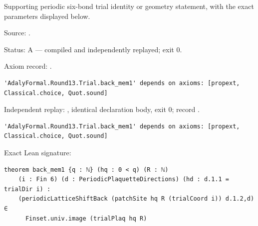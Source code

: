 \begin{theorem}[bp-390]
\label{bp-390}
\leanok
Supporting periodic six-bond trial identity or geometry statement, with the exact parameters displayed below.

\par Source: \texttt{}.
\par Status: A — compiled and independently replayed; exit 0.
\par Axiom record: \texttt{}.
\begin{verbatim}
'AdalyFormal.Round13.Trial.back_mem1' depends on axioms: [propext, Classical.choice, Quot.sound]
\end{verbatim}
\par Independent replay: \texttt{}, identical declaration body, exit 0; record \texttt{}.
\begin{verbatim}
'AdalyFormal.Round13.Trial.back_mem1' depends on axioms: [propext, Classical.choice, Quot.sound]
\end{verbatim}
\par Exact Lean signature:
\begin{verbatim}
theorem back_mem1 {q : ℕ} (hq : 0 < q) (R : ℕ)
    (i : Fin 6) (d : PeriodicPlaquetteDirections) (hd : d.1.1 = trialDir i) :
    (periodicLatticeShiftBack (patchSite hq R (trialCoord i)) d.1.2,d) ∈
      Finset.univ.image (trialPlaq hq R)
\end{verbatim}
\end{theorem}

